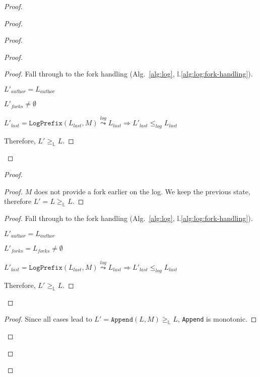 \documentclass[9pt, oneside]{article}   	%
\newcommand{\logleadsto}{\overset{\textit{log}}\leadsto}
\begin{document}
\begin{proof}
\begin{proof}
\begin{proof}
\begin{proof}
					\begin{proof}
						Fall through to the fork handling (Alg.~\ref{alg:log}, l.\ref{alg:log:fork-handling}).
						\begin{pfenum}
							\item $L'_\textit{author} = L_\textit{author}$
							\item $L'_\textit{forks} \neq \emptyset$
							\item $L'_\textit{last} = \texttt{LogPrefix}(L_\textit{last}, M) \logleadsto L_\textit{last} \Rightarrow L'_\textit{last} \leq_\textit{log} L_\textit{last}$
						\end{pfenum}
						Therefore, $L' \geq_\mathds{L} L$.
					\end{proof}

				\end{proof}
		
				\begin{proof}
					\begin{proof}
						$M$ does not provide a fork earlier on the log. We keep the previous state, therefore $L' = L \geq_\mathds{L} L$.
					\end{proof}
					
					\begin{proof}
						Fall through to the fork handling (Alg.~\ref{alg:log}, l.\ref{alg:log:fork-handling}).
						\begin{pfenum}
							\item $L'_\textit{author} = L_\textit{author}$
							\item $L'_\textit{forks} = L_\textit{forks} \neq \emptyset$
							\item $L'_\textit{last} = \texttt{LogPrefix}(L_\textit{last}, M) \logleadsto L_\textit{last} \Rightarrow  L'_\textit{last} \leq_\textit{log} L_\textit{last}$
						\end{pfenum}
						Therefore, $L' \geq_\mathds{L} L$.
					\end{proof}
				\end{proof}

			
			\qedstep{}
			\begin{proof}
				Since all cases lead to $L' = \texttt{Append}(L, M) \geq_\mathds{L} L$, \texttt{Append} is monotonic.
			\end{proof}
		\end{proof}
		

\end{proof}
\end{proof}
\end{document}
